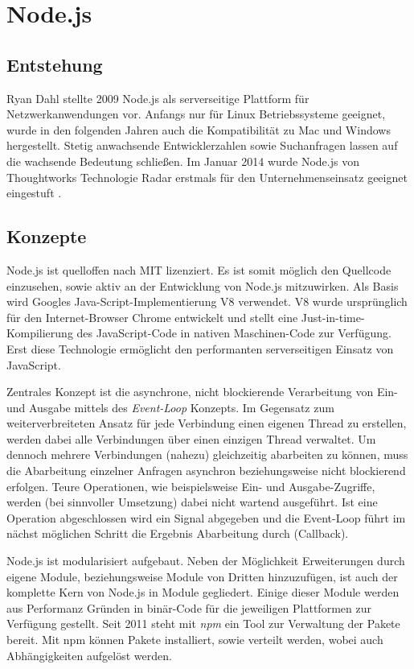 \chapter{Node.js}\label{node.js-marinus}

\section{Entstehung}\label{entstehung}

Ryan Dahl stellte 2009 Node.js als serverseitige Plattform für
Netzwerkanwendungen vor. Anfangs nur für Linux Betriebssysteme geeignet,
wurde in den folgenden Jahren auch die Kompatibilität zu Mac und Windows
hergestellt. Stetig anwachsende Entwicklerzahlen \cite{github-nodejs}
sowie Suchanfragen \cite{google-trend-nodejs} lassen auf die
wachsende Bedeutung schließen. Im Januar 2014 wurde Node.js von
Thoughtworks Technologie Radar erstmals für den Unternehmenseinsatz
geeignet eingestuft \cite{thoughtworks-node}.

\section{Konzepte}\label{konzepte-1}

Node.js ist quelloffen nach MIT lizenziert. Es ist somit möglich den
Quellcode einzusehen, sowie aktiv an der Entwicklung von Node.js
mitzuwirken. Als Basis wird Googles Java-Script-Implementierung V8
verwendet. V8 wurde ursprünglich für den Internet-Browser Chrome
entwickelt und stellt eine Just-in-time-Kompilierung des JavaScript-Code
in nativen Maschinen-Code zur Verfügung. Erst diese Technologie
ermöglicht den performanten serverseitigen Einsatz von JavaScript.

Zentrales Konzept ist die asynchrone, nicht blockierende Verarbeitung
von Ein- und Ausgabe mittels des \emph{Event-Loop} Konzepts. Im Gegensatz
zum weiterverbreiteten Ansatz für jede Verbindung einen eigenen Thread
zu erstellen, werden dabei alle Verbindungen über einen einzigen Thread
verwaltet. Um dennoch mehrere Verbindungen (nahezu) gleichzeitig
abarbeiten zu können, muss die Abarbeitung einzelner Anfragen asynchron
beziehungsweise nicht blockierend erfolgen. Teure Operationen, wie
beispielsweise Ein- und Ausgabe-Zugriffe, werden (bei sinnvoller Umsetzung) dabei
nicht wartend ausgeführt. Ist eine Operation abgeschlossen wird ein
Signal abgegeben und die Event-Loop führt im nächst möglichen Schritt
die Ergebnis Abarbeitung durch (Callback).

Node.js ist modularisiert aufgebaut. Neben der Möglichkeit Erweiterungen
durch eigene Module, beziehungsweise Module von Dritten hinzuzufügen,
ist auch der komplette Kern von Node.js in Module gegliedert. Einige
dieser Module werden aus Performanz Gründen in binär-Code für die
jeweiligen Plattformen zur Verfügung gestellt. Seit 2011 steht mit
\emph{npm} ein Tool zur Verwaltung der Pakete bereit. Mit npm können Pakete
installiert, sowie verteilt werden, wobei auch Abhängigkeiten aufgelöst
werden.

